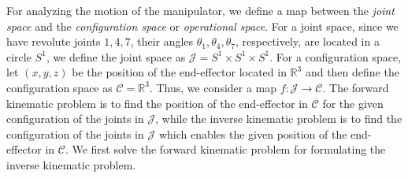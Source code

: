 \documentclass{birkjour}
\theoremstyle{plain}
\theoremstyle{definition}
\newcommand{\R}[0]{\mathbb{R}}
\begin{document}
    For analyzing the motion of the manipulator, we define a map between the \emph{joint space}
    and the \emph{configuration space} or \emph{operational space}. For a joint space, since we have revolute joints 
    $1,4,7$, their angles $\theta_1,\theta_4,\theta_7$, respectively, are located 
    in a circle $S^1$, we define the joint space as $\mathcal{J}=S^1\times S^1\times S^1$.
    For a configuration space, let $(x,y,z)$ be the position of the end-effector located in 
    $\R^3$ and then define the configuration space as $\mathcal{C}=\R^3$. Thus, we consider a map 
    $f:\mathcal{J}\longrightarrow\mathcal{C}$. The forward kinematic problem is to find 
    the position of the end-effector in $\mathcal{C}$ for the given configuration of 
    the joints in $\mathcal{J}$, while the inverse kinematic problem is 
    to find the configuration of the joints in $\mathcal{J}$ which enables the 
    given position of the end-effector in $\mathcal{C}$. 
    We first solve the forward kinematic problem for formulating the inverse kinematic problem. 
\end{document}
